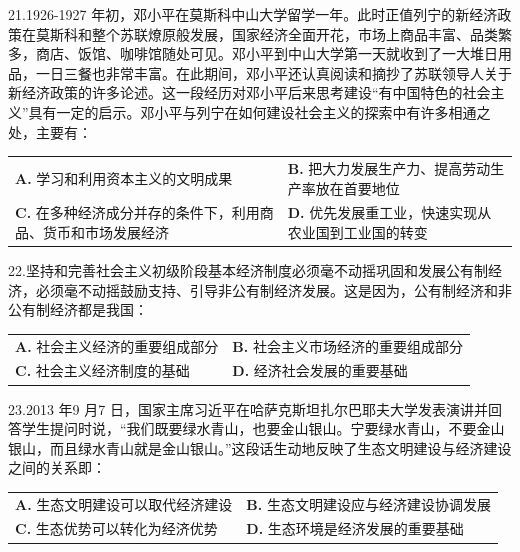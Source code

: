 \documentclass[UTF8,11pt]{ctexart}
\begin{document}
21.1926-1927 年初，邓小平在莫斯科中山大学留学一年。此时正值列宁的新经济政策在莫斯科和整个苏联燎原般发展，国家经济全面开花，市场上商品丰富、品类繁多，商店、饭馆、咖啡馆随处可见。邓小平到中山大学第一天就收到了一大堆日用品，一日三餐也非常丰富。在此期间，邓小平还认真阅读和摘抄了苏联领导人关于新经济政策的许多论述。这一段经历对邓小平后来思考建设“有中国特色的社会主义”具有一定的启示。邓小平与列宁在如何建设社会主义的探索中有许多相通之处，主要有：


\begin{center}\begin{tabular}{>{\raggedright\arraybackslash}p{\dimexpr(\linewidth-4\tabcolsep)/2\relax}>{\raggedright\arraybackslash}p{\dimexpr(\linewidth-4\tabcolsep)/2\relax}}
\textbf{A.} 学习和利用资本主义的文明成果 & \textbf{B.} 把大力发展生产力、提高劳动生产率放在首要地位\\[.35em]
\textbf{C.} 在多种经济成分并存的条件下，利用商品、货币和市场发展经济 & \textbf{D.} 优先发展重工业，快速实现从农业国到工业国的转变\\[.35em]\end{tabular}\end{center}

22.坚持和完善社会主义初级阶段基本经济制度必须毫不动摇巩固和发展公有制经济，必须毫不动摇鼓励支持、引导非公有制经济发展。这是因为，公有制经济和非公有制经济都是我国：


\begin{center}\begin{tabular}{>{\raggedright\arraybackslash}p{\dimexpr(\linewidth-4\tabcolsep)/2\relax}>{\raggedright\arraybackslash}p{\dimexpr(\linewidth-4\tabcolsep)/2\relax}}
\textbf{A.} 社会主义经济的重要组成部分 & \textbf{B.} 社会主义市场经济的重要组成部分\\[.35em]
\textbf{C.} 社会主义经济制度的基础 & \textbf{D.} 经济社会发展的重要基础\\[.35em]\end{tabular}\end{center}

23.2013 年9 月7 日，国家主席习近平在哈萨克斯坦扎尔巴耶夫大学发表演讲并回答学生提问时说，“我们既要绿水青山，也要金山银山。宁要绿水青山，不要金山银山，而且绿水青山就是金山银山。”这段话生动地反映了生态文明建设与经济建设之间的关系即：


\begin{center}\begin{tabular}{>{\raggedright\arraybackslash}p{\dimexpr(\linewidth-4\tabcolsep)/2\relax}>{\raggedright\arraybackslash}p{\dimexpr(\linewidth-4\tabcolsep)/2\relax}}
\textbf{A.} 生态文明建设可以取代经济建设 & \textbf{B.} 生态文明建设应与经济建设协调发展\\[.35em]
\textbf{C.} 生态优势可以转化为经济优势 & \textbf{D.} 生态环境是经济发展的重要基础\\[.35em]\end{tabular}\end{center}
\end{document}
